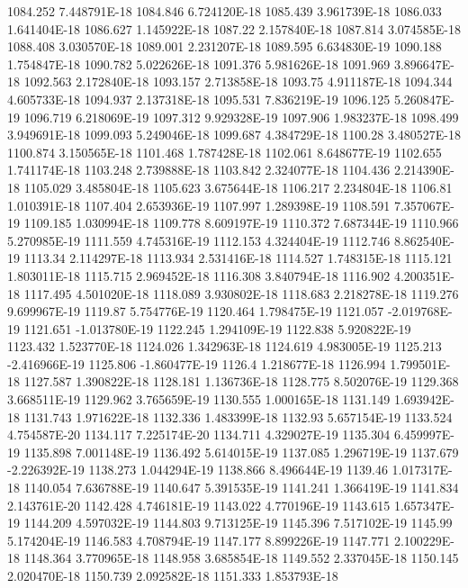 1084.252  7.448791E-18
1084.846  6.724120E-18
1085.439  3.961739E-18
1086.033  1.641404E-18
1086.627  1.145922E-18
1087.22  2.157840E-18
1087.814  3.074585E-18
1088.408  3.030570E-18
1089.001  2.231207E-18
1089.595  6.634830E-19
1090.188  1.754847E-18
1090.782  5.022626E-18
1091.376  5.981626E-18
1091.969  3.896647E-18
1092.563  2.172840E-18
1093.157  2.713858E-18
1093.75  4.911187E-18
1094.344  4.605733E-18
1094.937  2.137318E-18
1095.531  7.836219E-19
1096.125  5.260847E-19
1096.719  6.218069E-19
1097.312  9.929328E-19
1097.906  1.983237E-18
1098.499  3.949691E-18
1099.093  5.249046E-18
1099.687  4.384729E-18
1100.28  3.480527E-18
1100.874  3.150565E-18
1101.468  1.787428E-18
1102.061  8.648677E-19
1102.655  1.741174E-18
1103.248  2.739888E-18
1103.842  2.324077E-18
1104.436  2.214390E-18
1105.029  3.485804E-18
1105.623  3.675644E-18
1106.217  2.234804E-18
1106.81  1.010391E-18
1107.404  2.653936E-19
1107.997  1.289398E-19
1108.591  7.357067E-19
1109.185  1.030994E-18
1109.778  8.609197E-19
1110.372  7.687344E-19
1110.966  5.270985E-19
1111.559  4.745316E-19
1112.153  4.324404E-19
1112.746  8.862540E-19
1113.34  2.114297E-18
1113.934  2.531416E-18
1114.527  1.748315E-18
1115.121  1.803011E-18
1115.715  2.969452E-18
1116.308  3.840794E-18
1116.902  4.200351E-18
1117.495  4.501020E-18
1118.089  3.930802E-18
1118.683  2.218278E-18
1119.276  9.699967E-19
1119.87  5.754776E-19
1120.464  1.798475E-19
1121.057  -2.019768E-19
1121.651  -1.013780E-19
1122.245  1.294109E-19
1122.838  5.920822E-19
1123.432  1.523770E-18
1124.026  1.342963E-18
1124.619  4.983005E-19
1125.213  -2.416966E-19
1125.806  -1.860477E-19
1126.4  1.218677E-18
1126.994  1.799501E-18
1127.587  1.390822E-18
1128.181  1.136736E-18
1128.775  8.502076E-19
1129.368  3.668511E-19
1129.962  3.765659E-19
1130.555  1.000165E-18
1131.149  1.693942E-18
1131.743  1.971622E-18
1132.336  1.483399E-18
1132.93  5.657154E-19
1133.524  4.754587E-20
1134.117  7.225174E-20
1134.711  4.329027E-19
1135.304  6.459997E-19
1135.898  7.001148E-19
1136.492  5.614015E-19
1137.085  1.296719E-19
1137.679  -2.226392E-19
1138.273  1.044294E-19
1138.866  8.496644E-19
1139.46  1.017317E-18
1140.054  7.636788E-19
1140.647  5.391535E-19
1141.241  1.366419E-19
1141.834  2.143761E-20
1142.428  4.746181E-19
1143.022  4.770196E-19
1143.615  1.657347E-19
1144.209  4.597032E-19
1144.803  9.713125E-19
1145.396  7.517102E-19
1145.99  5.174204E-19
1146.583  4.708794E-19
1147.177  8.899226E-19
1147.771  2.100229E-18
1148.364  3.770965E-18
1148.958  3.685854E-18
1149.552  2.337045E-18
1150.145  2.020470E-18
1150.739  2.092582E-18
1151.333  1.853793E-18
